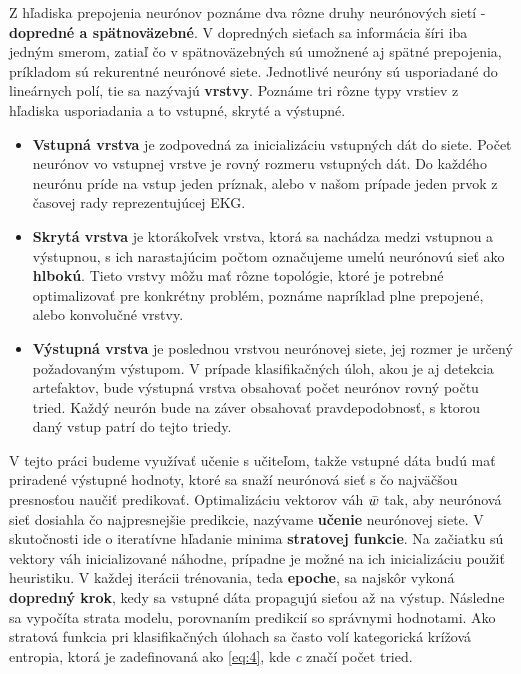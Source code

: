 Z hľadiska prepojenia neurónov poznáme dva rôzne druhy neurónových sietí - \textbf{dopredné a spätnoväzebné}. V dopredných sieťach sa informácia šíri iba jedným smerom, zatiaľ čo v spätnoväzebných sú umožnené aj spätné prepojenia, príkladom sú rekurentné neurónové siete.
Jednotlivé neuróny sú usporiadané do lineárnych polí, tie sa nazývajú \textbf{vrstvy}. Poznáme tri rôzne typy vrstiev z hľadiska usporiadania a to vstupné, skryté a výstupné. 
\begin{itemize}
    \item \textbf{Vstupná vrstva} je zodpovedná za inicializáciu vstupných dát do siete. Počet neurónov vo vstupnej vrstve je rovný rozmeru vstupných dát. Do každého neurónu príde na vstup jeden príznak, alebo v našom prípade jeden prvok z časovej rady reprezentujúcej EKG. 
    \item \textbf{Skrytá vrstva} je ktorákoľvek vrstva, ktorá sa nachádza medzi vstupnou a výstupnou, s ich narastajúcim počtom označujeme umelú neurónovú sieť ako \textbf{hlbokú}. Tieto vrstvy môžu mať rôzne topológie, ktoré je potrebné optimalizovať pre konkrétny problém, poznáme napríklad plne prepojené, alebo konvolučné vrstvy.
    \item \textbf{Výstupná vrstva} je poslednou vrstvou neurónovej siete, jej rozmer je určený požadovaným výstupom. V prípade klasifikačných úloh, akou je aj detekcia artefaktov, bude výstupná vrstva obsahovať počet neurónov rovný počtu tried. Každý neurón bude na záver obsahovať pravdepodobnosť, s ktorou daný vstup patrí do tejto triedy.
\end{itemize}

V tejto práci budeme využívať učenie s učiteľom, takže vstupné dáta budú mať priradené výstupné hodnoty, ktoré sa snaží neurónová sieť s čo najväčšou presnosťou naučiť predikovať. Optimalizáciu vektorov váh \textit{\( \Bar{w} \)} tak, aby neurónová sieť dosiahla čo najpresnejšie predikcie, nazývame \textbf{učenie} neurónovej siete. V skutočnosti ide o iteratívne hľadanie minima \textbf{stratovej funkcie}. Na začiatku sú vektory váh inicializované náhodne, prípadne je možné na ich inicializáciu použiť heuristiku. V každej iterácii trénovania, teda \textbf{epoche}, sa najskôr vykoná \textbf{dopredný krok}, kedy sa vstupné dáta propagujú sieťou až na výstup. Následne sa vypočíta strata modelu, porovnaním predikcií so správnymi hodnotami. Ako stratová funkcia pri klasifikačných úlohach sa často volí kategorická krížová entropia, ktorá je zadefinovaná ako \ref{eq:4}, kde \textit{c} značí počet tried.

